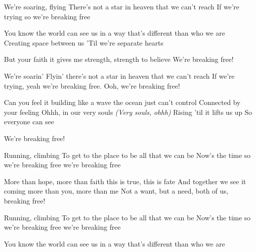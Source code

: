 \begin{verse*}
We're soaring, flying
There's not a star in heaven that we can’t reach
If we're trying
so we're breaking free
\end{verse*}

\begin{verse*}
You know the world can see us
in a way that's different than who we are
Creating space between us
'Til we're separate hearts
\end{verse*}

\begin{verse*}
But your faith it gives me strength,
strength to believe
We're breaking free!
\end{verse*}

\begin{chorus}
We're soarin'
Flyin'
there's not a star in heaven that we can’t reach
If we're trying,
yeah we're breaking free.
Ooh, we're breaking free!
\end{chorus}

\begin{verse*}
Can you feel it building
like a wave the ocean just can’t control
Connected by your feeling
Ohhh, in our very souls \textit{(Very souls, ohhh)}
Rising 'til it lifts us up
So everyone can see
\end{verse*}

\begin{verse*}
We're breaking free!
\end{verse*}

\thechorus

\begin{verse*}
Running, climbing
To get to the place to be all that we can be
Now's the time
so we're breaking free
we're breaking free
\end{verse*}

\begin{bridge}
More than hope, more than faith
this is true, this is fate
And together we see it coming
more than you, more than me
Not a want, but a need,
both of us, breaking free!
\end{bridge}

\thechorus

\begin{verse*}
Running, climbing
To get to the place to be all that we can be
Now's the time
so we're breaking free
we're breaking free
\end{verse*}

\begin{verse*}
You know the world can see us
in a way that's different than who we are
\end{verse*}